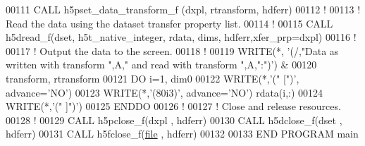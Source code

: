 \begin{DoxyCode}
00111   \textcolor{keyword}{CALL }h5pset\_data\_transform\_f (dxpl, rtransform, hdferr)
00112   \textcolor{comment}{!}
00113   \textcolor{comment}{! Read the data using the dataset transfer property list.}
00114   \textcolor{comment}{!}
00115   \textcolor{keyword}{CALL }h5dread\_f(dset, h5t\_native\_integer, rdata, dims, hdferr,xfer\_prp=dxpl)
00116   \textcolor{comment}{!}
00117   \textcolor{comment}{! Output the data to the screen.}
00118   \textcolor{comment}{!}
00119   \textcolor{keyword}{WRITE}(*, \textcolor{stringliteral}{'(/,"Data as written with transform ",A," and read with transform ",A,":")'}) &
00120        transform, rtransform
00121   \textcolor{keywordflow}{DO} i=1, dim0
00122      \textcolor{keyword}{WRITE}(*,\textcolor{stringliteral}{'(" [")'}, advance=\textcolor{stringliteral}{'NO'})
00123      \textcolor{keyword}{WRITE}(*,\textcolor{stringliteral}{'(80i3)'}, advance=\textcolor{stringliteral}{'NO'}) rdata(i,:)
00124      \textcolor{keyword}{WRITE}(*,\textcolor{stringliteral}{'(" ]")'})
00125 \textcolor{keywordflow}{  ENDDO}
00126   \textcolor{comment}{!}
00127   \textcolor{comment}{! Close and release resources.}
00128   \textcolor{comment}{!}
00129   \textcolor{keyword}{CALL }h5pclose\_f(dxpl , hdferr)
00130   \textcolor{keyword}{CALL }h5dclose\_f(dset , hdferr)
00131   \textcolor{keyword}{CALL }h5fclose\_f(\hyperlink{structfile}{file} , hdferr)
00132 
00133 \textcolor{keyword}{END PROGRAM }main
\end{DoxyCode}
